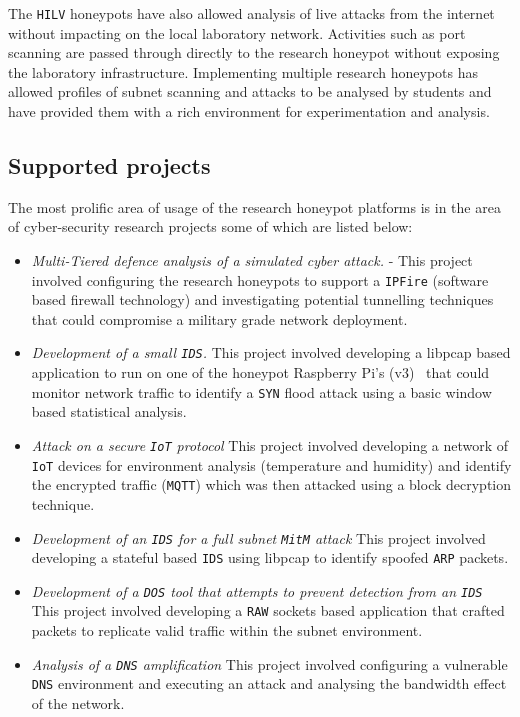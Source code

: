 The \texttt{HILV} honeypots have also allowed analysis of live attacks from the internet without impacting on the local laboratory network. Activities such as port scanning are passed through directly to the research honeypot without exposing the laboratory infrastructure. Implementing multiple research honeypots has allowed profiles of subnet scanning and attacks to be analysed by students and have provided them with a rich environment for experimentation and analysis.    

\subsection{Supported projects}\label{Projects}
The most prolific area of usage of the research honeypot platforms is in the area of cyber-security research projects some of which are listed below: 
\begin{itemize}
\item \noindent \emph{Multi-Tiered defence analysis of a simulated cyber attack.} - This project involved configuring the research honeypots to support a \texttt{IPFire} (software based firewall technology) and investigating potential tunnelling techniques that could compromise a military grade network deployment.
\item \noindent \emph{Development of a small \texttt{IDS}.} This project involved developing a libpcap based application to run on one of the honeypot Raspberry Pi's (v3)~\cite{RASP:17} that could monitor network traffic to identify a \texttt{SYN} flood attack using a basic window based statistical analysis.
\item \noindent \emph{Attack on a secure \texttt{IoT} protocol} This project involved developing a network of \texttt{IoT} devices for environment analysis (temperature and humidity) and identify the encrypted traffic (\texttt{MQTT}) which was then attacked using a block decryption technique.
\item \noindent \emph{Development of an \texttt{IDS} for a full subnet \texttt{MitM} attack} This project involved developing a stateful based \texttt{IDS} using libpcap to identify spoofed \texttt{ARP} packets.
\item \noindent \emph{Development of a \texttt{DOS} tool that attempts to prevent detection from an \texttt{IDS}} This project involved developing a \texttt{RAW} sockets based application that crafted packets to replicate valid traffic within the subnet environment.
\item \noindent \emph{Analysis of a \texttt{DNS} amplification} This project involved configuring a vulnerable \texttt{DNS} environment and executing an attack and analysing the bandwidth effect of the network.
\end{itemize}

